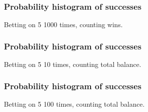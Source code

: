 \documentclass[handout]{beamer}
\begin{document}


   \begin{frame}
   \frametitle{Probability histogram of successes}
   \begin{center}
   \end{center}
   Betting on {\color{red} 5} 1000 times, counting wins.
   \end{frame}



   \begin{frame}
   \frametitle{Probability histogram of successes}
   \begin{center}
   \end{center}
   Betting on {\color{red} 5} 10 times, counting total balance.
   \end{frame}



   \begin{frame}
   \frametitle{Probability histogram of successes}
   \begin{center}
   \end{center}
   Betting on {\color{red} 5} 100 times, counting total balance.
   \end{frame}
\end{document}
